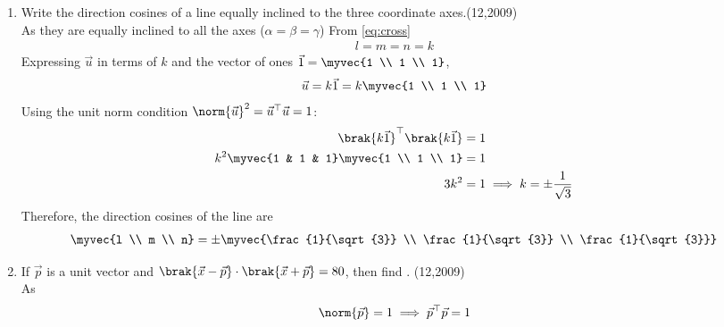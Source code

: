 \begin{enumerate}[label=\thesubsection.\arabic*, ref=\thesubsection.\theenumi]
\begin{align}
  	\myvec{
  		6p - 81 \\
  		27 - 2p \\
  		0
  	} = \myvec{0 \\ 0 \\ 0}
  \end{align}
  Equating the respective non-zero components:
  \begin{align}
  	6p - 81 = 0 &\implies 6p = 81 \implies p = \frac{27}{2} \\
  	27 - 2p = 0 &\implies 2p = 27 \implies p = \frac{27}{2}
  \end{align}
  \begin{align}
  	p = \frac{27}{2} = 13.5
  \end{align}
    \item Write the direction cosines of a line equally inclined to the three coordinate axes.\hfill{(12,2009)} \\
    \solution
    As they are equally inclined to all the axes ($\alpha = \beta = \gamma$)
    From \eqref{eq:cross}
    \begin{align}
    	l = m = n = k
    \end{align}
    Expressing $\vec{u}$ in terms of $k$ and the vector of ones $\vec{1} = \myvec{1 \\ 1 \\ 1}$,
    \begin{align}
    	\vec{u} = k \vec{1} = k \myvec{1 \\ 1 \\ 1}
    \end{align}
    Using the unit norm condition $\norm{\vec{u}}^2 = \vec{u}^{\top} \vec{u} = 1$:
    \begin{align}
    	\brak{k \vec{1}}^{\top} \brak{k \vec{1}} &= 1
    	\\
    	k^2 \myvec{1 & 1 & 1} \myvec{1 \\ 1 \\ 1} &= 1
    	\\
    	3k^2 &= 1 \implies k = \pm \frac{1}{\sqrt{3}}
    \end{align}
    Therefore, the direction cosines of the line are
    \begin{align}
    	\myvec{l \\ m \\ n} = \pm \myvec{\frac{1}{\sqrt{3}} \\ \frac{1}{\sqrt{3}} \\ \frac{1}{\sqrt{3}}}
    \end{align}
    \item If $\vec{p}$ is a unit vector and $\brak{\vec{x} - \vec{p}} \cdot \brak{\vec{x} + \vec{p}} = 80$, then find . \hfill{(12,2009)} \\
    \solution
    As
    \begin{align}
    	\norm{\vec{p}} = 1 \implies \vec{p}^{\top}\vec{p} = 1
    \end{align}
  	

\end{enumerate}
